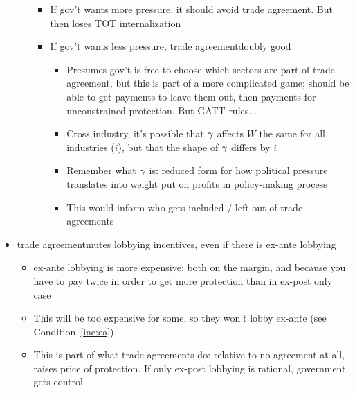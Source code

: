 \begin{itemize}
\begin{itemize}
\begin{itemize}
					\item If gov't wants more pressure, it should avoid trade agreement. But then loses TOT internalization
					\item If gov't wants less pressure, trade agreementdoubly good
						\begin{itemize}
							\item Presumes gov't is free to choose which sectors are part of trade agreement, but this is part of a more complicated game; should be able to get payments to leave them out, then payments for unconstrained protection. But GATT rules...
							\item Cross industry, it's possible that $\gamma$ affects $W$ the same for all industries ($i$), but that the shape of $\gamma$ differs by $i$
							\item Remember what $\gamma$ is: reduced form for how political pressure translates into weight put on profits in policy-making process
							\item This would inform who gets included / left out of trade agreements
						\end{itemize}
					\end{itemize}
		\end{itemize}
	\item trade agreementmutes lobbying incentives, even if there is ex-ante lobbying
		\begin{itemize}
			\item ex-ante lobbying is more expensive: both on the margin, and because you have to pay twice in order to get more protection than in ex-post only case
			\item This will be too expensive for some, so they won't lobby ex-ante (see Condition~\ref{ine:ea})
			\item This is part of what trade agreements do: relative to no agreement at all, raises price of protection. If only ex-post lobbying is rational, government gets control
		\end{itemize}


\end{itemize}
